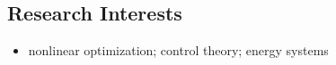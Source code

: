 \subsection*{Research Interests}
\begin{itemize}[itemsep=1pt, parsep=0pt,leftmargin=*]
\item[]  nonlinear optimization; control theory; energy systems
\end{itemize}
